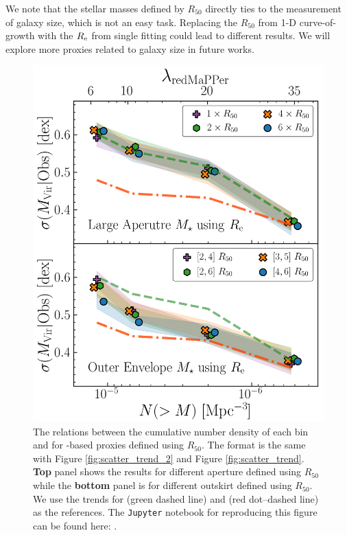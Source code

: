 \documentclass[fleqn,usenatbib,useAMS]{mnras}
\begin{document}
    We note that the stellar masses defined by $R_{50}$ directly ties to the measurement of galaxy 
    size, which is not an easy task.
    Replacing the $R_{50}$ from 1-D curve-of-growth with the $R_{\rm e}$ from single \ser{} fitting 
    could lead to different results.
    We will explore more \mvir{} proxies related to galaxy size in future works.
    
\begin{figure}
    \centering
    \includegraphics[width=\columnwidth]{figure/fig_E1}
    \caption{
        The relations between the cumulative number density of each \topn{} bin and \sigmvir{} 
        for \mstar{}-based \mvir{} proxies defined using $R_{50}$.
        The format is the same with Figure \ref{fig:scatter_trend_2} and Figure 
        \ref{fig:scatter_trend}.
        \textbf{Top} panel shows the \topn{} results for different aperture \mstar{} defined using 
        $R_{50}$ while the \textbf{bottom} panel is for different outskirt \mstar{} defined using 
        $R_{50}$.
        We use the \sigmvir{} trends for  (green dashed line) and  
        (red dot--dashed line) as the references.
        The \texttt{Jupyter} notebook for reproducing this figure can be found here:
        \href{https://github.com/dr-guangtou/jianbing/blob/master/notebooks/figure/figE1.ipynb}{\faGithub}.
    }
    \label{fig:scatter_trend_size}
\end{figure}
\end{document}
